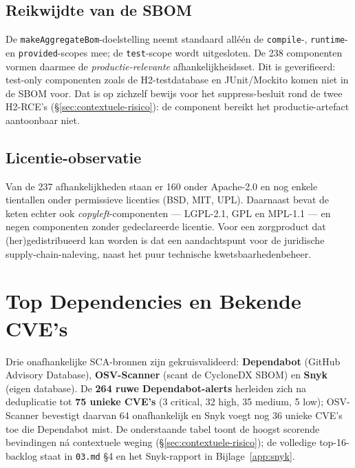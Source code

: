 \documentclass[12pt, a4paper]{report}
\begin{document}
\subsection*{Reikwijdte van de SBOM}

De \texttt{makeAggregateBom}-doelstelling neemt standaard alléén de \texttt{compile}-,
\texttt{runtime}- en \texttt{provided}-scopes mee; de \texttt{test}-scope wordt
uitgesloten. De 238 componenten vormen daarmee de \emph{productie-relevante}
afhankelijkheidsset. Dit is geverifieerd: test-only componenten zoals de
H2-testdatabase en JUnit/Mockito komen niet in de SBOM voor. Dat is op zichzelf
bewijs voor het suppress-besluit rond de twee H2-RCE's
(\S\ref{sec:contextuele-risico}): de component bereikt het productie-artefact
aantoonbaar niet.

\subsection*{Licentie-observatie}

Van de 237 afhankelijkheden staan er 160 onder Apache-2.0 en nog enkele tientallen
onder permissieve licenties (BSD, MIT, UPL). Daarnaast bevat de keten echter ook
\emph{copyleft}-componenten --- LGPL-2.1, GPL en MPL-1.1 --- en negen componenten
zonder gedeclareerde licentie. Voor een zorgproduct dat (her)gedistribueerd kan
worden is dat een aandachtspunt voor de juridische supply-chain-naleving, naast
het puur technische kwetsbaarhedenbeheer.

\section{Top Dependencies en Bekende CVE's}
\label{sec:top-dependencies}

Drie onafhankelijke SCA-bronnen zijn gekruisvalideerd: \textbf{Dependabot}
(GitHub Advisory Database), \textbf{OSV-Scanner} (scant de CycloneDX SBOM) en
\textbf{Snyk} (eigen database). De \textbf{264 ruwe Dependabot-alerts} herleiden
zich na deduplicatie tot \textbf{75 unieke CVE's} (3 critical, 32 high, 35 medium,
5 low); OSV-Scanner bevestigt daarvan 64 onafhankelijk en Snyk voegt nog 36 unieke
CVE's toe die Dependabot mist. De onderstaande tabel toont de hoogst scorende
bevindingen ná contextuele weging (\S\ref{sec:contextuele-risico}); de volledige
top-16-backlog staat in \texttt{03.md} \S4 en het Snyk-rapport in
Bijlage~\ref{app:snyk}.
\end{document}
